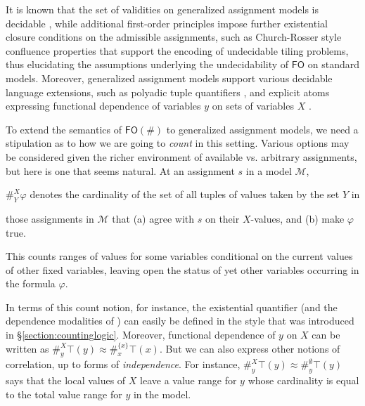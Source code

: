 \documentclass[12pt,oneside,reqno]{amsart}
\theoremstyle{definition}
\begin{document}
It is known that the set of validities on generalized assignment models is decidable \citep{Nemeti}, while additional first-order principles impose further existential closure conditions on the admissible assignments, such as Church-Rosser style confluence properties that support the encoding of undecidable tiling problems, thus elucidating the assumptions underlying the undecidability of $\mathsf{FO}$ on standard models. Moreover, generalized assignment models  support various  decidable language extensions, such as polyadic tuple quantifiers \citep{vanBenthem2005}, and explicit atoms expressing functional dependence of variables $y$ on sets of variables $X$ \citep{BaltagvanBenthem}.

\vspace{1ex}

To extend the semantics of $\mathsf{FO}(\#)$ to generalized assignment models, we need a stipulation as to how we are going to \emph{count} in this setting. Various options may be considered given the richer environment of available vs. arbitrary assignments, but here is one that seems natural. At an assignment $s$ in a model $\mathcal{M}$, 

\vspace{1.5ex}

 \quad $\#^{X}_Y \varphi$ denotes the cardinality of the set of all tuples of values taken by the set $Y$ in
 
 \vspace{0.3ex}
 \quad those assignments in $\mathcal{M}$ that (a) agree with $s$ on their $X$-values, and (b) make $\varphi$ true. 

\vspace{1.5ex}

\noindent This counts ranges of values for some variables conditional on the current values of other fixed variables, leaving open  the status of yet other variables occurring in the formula $\varphi$. 

In terms of this count notion, for instance, the existential quantifier (and the dependence modalities of \citealt{BaltagvanBenthem}) can easily be defined in the style that was introduced in \S\ref{section:countinglogic}. Moreover, functional dependence of $y$ on $X$ can be written as    $\#^{X}_y \top(y) \approx \#^{\{x\}}_x \top(x)$. But we can also express other notions of correlation, up to forms of \emph{independence}. For instance, $\#^{X}_y \top(y) \approx \#^{\emptyset}_y \top(y)$ says that the local values of $X$ leave a value range for $y$ whose cardinality is equal to the total value range for $y$ in the model.
\end{document}
